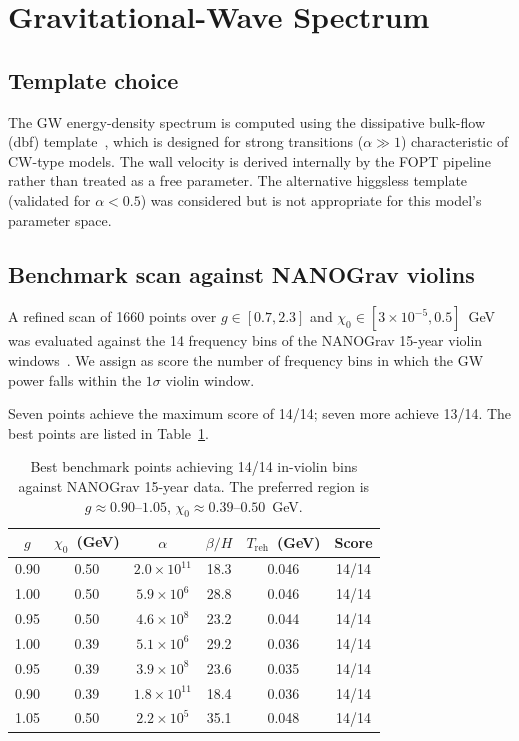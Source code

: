 \documentclass[12pt,a4paper]{article}
\begin{document}
\section{Gravitational-Wave Spectrum}
\label{sec:gw}

\subsection{Template choice}

The GW energy-density spectrum is computed using the dissipative bulk-flow (dbf) template~\cite{DBFtemplate}, which is designed for strong transitions ($\alpha \gg 1$) characteristic of CW-type models. The wall velocity is derived internally by the FOPT pipeline rather than treated as a free parameter. The alternative higgsless template (validated for $\alpha < 0.5$) was considered but is not appropriate for this model's parameter space.

\subsection{Benchmark scan against NANOGrav violins}

A refined scan of 1660 points over $g \in [0.7, 2.3]$ and $\chi_0 \in [3\times10^{-5}, 0.5]$~GeV was evaluated against the 14 frequency bins of the NANOGrav 15-year violin windows~\cite{Agazie:2023}. We assign as score the number of frequency bins in which the GW power falls within the $1\sigma$ violin window.

Seven points achieve the maximum score of 14/14; seven more achieve 13/14. The best points are listed in Table~\ref{tab:best_benchmarks}.

\begin{table}[h]
\centering
\begin{tabular}{cccccc}
\toprule
$g$ & $\chi_0$~(GeV) & $\alpha$ & $\beta/H$ & $T_{\text{reh}}$~(GeV) & Score \\
\midrule
0.90 & 0.50 & $2.0\times10^{11}$ & 18.3 & 0.046 & 14/14 \\
1.00 & 0.50 & $5.9\times10^{6}$  & 28.8 & 0.046 & 14/14 \\
0.95 & 0.50 & $4.6\times10^{8}$  & 23.2 & 0.044 & 14/14 \\
1.00 & 0.39 & $5.1\times10^{6}$  & 29.2 & 0.036 & 14/14 \\
0.95 & 0.39 & $3.9\times10^{8}$  & 23.6 & 0.035 & 14/14 \\
0.90 & 0.39 & $1.8\times10^{11}$ & 18.4 & 0.036 & 14/14 \\
1.05 & 0.50 & $2.2\times10^{5}$  & 35.1 & 0.048 & 14/14 \\
\bottomrule
\end{tabular}
\caption{Best benchmark points achieving 14/14 in-violin bins against NANOGrav 15-year data. The preferred region is $g \approx 0.90$--$1.05$, $\chi_0 \approx 0.39$--$0.50$~GeV.}
\label{tab:best_benchmarks}
\end{table}
\end{document}
